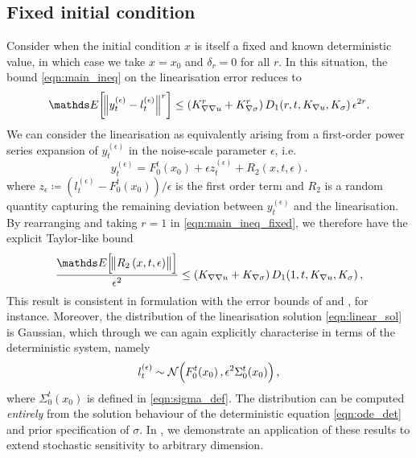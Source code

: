 \subsection{Fixed initial condition}\label{sec:theory_fixed}
Consider when the initial condition \(x\) is itself a fixed and known deterministic value, in which case we take \(x = x_0\) and \(\delta_r = 0\) for all \(r\).
In this situation, the bound \cref{eqn:main_ineq} on the linearisation error reduces to
\begin{equation}
	\avg{\norm{y_t^{(\epsilon)} - l_t^{(\epsilon)}}^r} \leq \left(K_{\nabla\nabla u}^r + K_{\nabla\sigma}^r\right)D_1\!\left(r,t, K_{\nabla u}, K_\sigma\right)\epsilon^{2r}.
	\label{eqn:main_ineq_fixed}
\end{equation}
We can consider the linearisation as equivalently arising from a first-order power series expansion of \(y_t^{(\epsilon)}\) in the noise-scale parameter \(\epsilon\), i.e.
\[
	y_t^{(\epsilon)} = F_0^t\!\left(x_0\right) + \epsilon z_t^{(\epsilon)} + R_2\left(x,t,\epsilon\right).
\]
where \(z_\epsilon \coloneqq \left(l_{t}^{(\epsilon)} - F_0^t\!\left(x_0\right)\right) / \epsilon\) is the first order term and \(R_2\) is a random quantity capturing the remaining deviation between \(y_t^{(\epsilon)}\) and the linearisation.
By rearranging and taking \(r = 1\) in \cref{eqn:main_ineq_fixed}, we therefore have the explicit Taylor-like bound
\[
	\frac{\avg{\norm{R_2\left(x,t,\epsilon\right)}}}{\epsilon^2} \leq \left(K_{\nabla \nabla u} + K_{\nabla\sigma}\right)D_1\!\left(1,t, K_{\nabla u}, K_\sigma\right),
\]
This result is consistent in formulation with the error bounds of \citet{Blagoveshchenskii_1962_DiffusionProcessesDepending} and \citet{FreidlinWentzell_1998_RandomPerturbationsDynamical}, for instance.
Moreover, the distribution of the linearisation solution \cref{eqn:linear_sol} is Gaussian, which through  we can again explicitly characterise in terms of the deterministic system, namely
\begin{equation}
	l_t^{(\epsilon)} \sim\mathcal{N}\!\left(F_0^t\!\left(x_0\right), \epsilon^2 \Sigma_0^t\!\left(x_0\right)\right),
	\label{eqn:linear_gauss_sol}
\end{equation}
where \(\Sigma_0^t\!\left(x_0\right)\) is defined in \cref{eqn:sigma_def}.
The distribution can be computed \emph{entirely} from the solution behaviour of the deterministic equation \cref{eqn:ode_det} and prior specification of \(\sigma\).
In , we demonstrate an application of these results to extend stochastic sensitivity \citep{Balasuriya_2020_StochasticSensitivityComputable} to arbitrary dimension.


